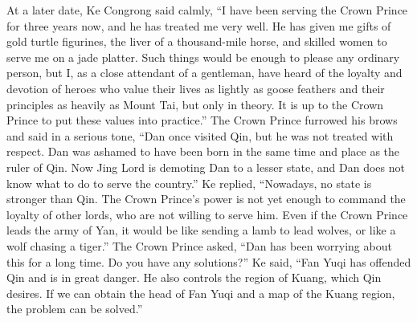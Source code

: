 \documentclass[12pt]{book}
\begin{document}
\begin{pairs}
\begin{Leftside}
\begin{fioesjfsoeifj}
At a later date, Ke Congrong said calmly, ``I have been serving the Crown Prince for three years now, and he has treated me very well. He has given me gifts of gold turtle figurines, the liver of a thousand-mile horse, and skilled women to serve me on a jade platter. Such things would be enough to please any ordinary person, but I, as a close attendant of a gentleman, have heard of the loyalty and devotion of heroes who value their lives as lightly as goose feathers and their principles as heavily as Mount Tai, but only in theory. It is up to the Crown Prince to put these values into practice.'' The Crown Prince furrowed his brows and said in a serious tone, ``Dan once visited Qin, but he was not treated with respect. Dan was ashamed to have been born in the same time and place as the ruler of Qin. Now Jing Lord is demoting Dan to a lesser state, and Dan does not know what to do to serve the country.'' Ke replied, ``Nowadays, no state is stronger than Qin. The Crown Prince's power is not yet enough to command the loyalty of other lords, who are not willing to serve him. Even if the Crown Prince leads the army of Yan, it would be like sending a lamb to lead wolves, or like a wolf chasing a tiger.'' The Crown Prince asked, ``Dan has been worrying about this for a long time. Do you have any solutions?'' Ke said, ``Fan Yuqi has offended Qin and is in great danger. He also controls the region of Kuang, which Qin desires. If we can obtain the head of Fan Yuqi and a map of the Kuang region, the problem can be solved.''


\end{fioesjfsoeifj}
\end{Leftside}
\end{pairs}
\end{document}
